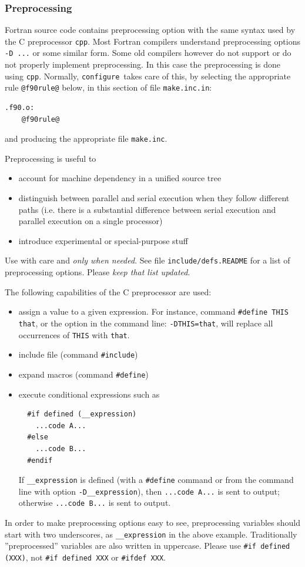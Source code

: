 \documentclass[12pt,a4paper]{article}
\def\configure{\texttt{configure}}
\def\make.inc{\texttt{make.inc}}
\begin{document}
\subsubsection{Preprocessing}

\label{SubSec:CPP}
Fortran source code contains preprocessing option with
the same syntax used by the C preprocessor \texttt{cpp}.
Most Fortran compilers understand preprocessing options \texttt{-D ...}
or some similar form. Some old compilers however do not support
or do not properly implement preprocessing. In this case the
preprocessing is done using \texttt{cpp}.
Normally, \configure\ takes care of this, by selecting the
appropriate rule \texttt{@f90rule@} below, in this section
of file \texttt{make.inc.in}:
\begin{verbatim}
.f90.o:
	@f90rule@
\end{verbatim}
and producing the appropriate file \make.inc.

Preprocessing is useful to
\begin{itemize}
\item account for machine dependency in a unified source tree
\item distinguish between parallel and serial execution when they
follow different paths (i.e. there is a substantial difference between
serial execution and parallel execution on a single processor)
\item  introduce experimental or special-purpose stuff
\end{itemize}
Use with care and {\em only when needed}. See file
\texttt{include/defs.README} for a list of preprocessing
options. Please {\em keep that list updated}.

The following capabilities of the C preprocessor are used:
\begin{itemize}
\item assign a value to a given expression. For instance, command
  \texttt{\#define THIS that}, or the option in the command line:
  \texttt{-DTHIS=that}, will replace all occurrences of \texttt{THIS}
  with \texttt{that}.
\item include file (command \texttt{\#include})
\item expand macros (command \texttt{\#define})
\item execute conditional expressions such as
\begin{verbatim}
  #if defined (__expression)
    ...code A...
  #else
    ...code B...
  #endif
\end{verbatim}
If \texttt{\_\_expression} is defined (with a \texttt{\#define} command
or from the command line with option \texttt{-D\_\_expression}),
then  \texttt{...code A...} is sent to output; otherwise
\texttt{...code B...} is sent to output.

\end{itemize}
In order to make  preprocessing options
easy to see, preprocessing variables should start with
two underscores, as \texttt{\_\_expression} in the above
example. Traditionally ''preprocessed'' variables are also written in
uppercase. Please use \verb|#if defined (XXX)|, not
\verb|#if defined XXX| or \verb|#ifdef XXX|.
\end{document}

